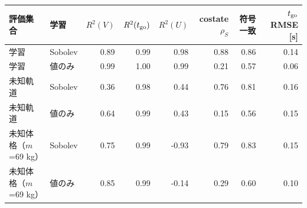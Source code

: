 \begin{tabular}{llrrrrrr}
\toprule
評価集合 & 学習 & $R^2(V)$ & $R^2(t_{\rm go})$ & $R^2(U)$ & costate $\rho_S$ & 符号一致 & $t_{\rm go}$ RMSE [s] \\
\midrule
学習 & Sobolev & 0.89 & 0.99 & 0.98 & 0.88 & 0.86 & 0.14 \\
学習 & 値のみ & 0.99 & 1.00 & 0.99 & 0.21 & 0.57 & 0.06 \\
\midrule
未知軌道 & Sobolev & 0.36 & 0.98 & 0.44 & 0.76 & 0.81 & 0.16 \\
未知軌道 & 値のみ & 0.64 & 0.99 & 0.43 & 0.15 & 0.56 & 0.15 \\
\midrule
未知体格（$m$=69 kg） & Sobolev & 0.75 & 0.99 & -0.93 & 0.79 & 0.83 & 0.15 \\
未知体格（$m$=69 kg） & 値のみ & 0.85 & 0.99 & -0.14 & 0.29 & 0.60 & 0.10 \\
\bottomrule
\end{tabular}
